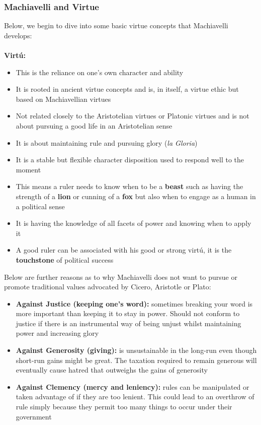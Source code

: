 \documentclass[12pt, letterpaper]{article}
\begin{document}
\subsubsection{Machiavelli and Virtue}
Below, we begin to dive into some basic virtue concepts that Machiavelli develops:\\\\
\textbf{Virtú:}
\begin{itemize}
	\item This is the reliance on one's own character and ability
	\item It is rooted in ancient virtue concepts and is, in itself, a virtue ethic but based on Machiavellian virtues
	\item Not related closely to the Aristotelian virtues or Platonic virtues and is not about pursuing a good life in an Aristotelian sense
	\item It is about maintaining rule and pursuing glory (\textit{la Gloria})
	\item  It is a stable but flexible character disposition used to respond well to the moment
	\item This means a ruler needs to know when to be a \textbf{beast} such as having the strength of a \textbf{lion} or cunning of a \textbf{fox} but also when to engage as a human in a political sense
	\item It is having the knowledge of all facets of power and knowing when to apply it
	\item A good ruler can be associated with his good or strong virtú, it is the \textbf{touchstone} of political success
\end{itemize}
Below are further reasons as to why Machiavelli does not want to pursue or promote traditional values advocated by Cicero, Aristotle or Plato:
\begin{itemize}
	\item \textbf{Against Justice (keeping one's word):} sometimes breaking your word is more important than keeping it to stay in power. Should not conform to justice if there is an instrumental way of being unjust whilst maintaining power and increasing glory
	\item \textbf{Against Generosity (giving):} is unsustainable in the long-run even though short-run gains might be great. The taxation required to remain generous will eventually cause hatred that outweighs the gains of generosity
	\item \textbf{Against Clemency (mercy and leniency):} rules can be manipulated or taken advantage of if they are too lenient. This could lead to an overthrow of rule simply because they permit too many things to occur under their government
\end{itemize}
\end{document}
